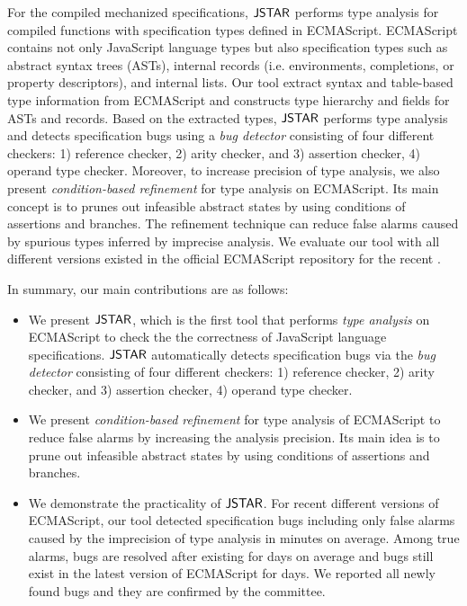 For the compiled mechanized specifications, $\textsf{JSTAR}$ performs type analysis for
compiled functions with specification types defined in ECMAScript.  ECMAScript
contains not only JavaScript language types but also specification types such as
abstract syntax trees (ASTs), internal records (i.e. environments, completions,
or property descriptors), and internal lists.  Our tool extract syntax and
table-based type information from ECMAScript and constructs type hierarchy and
fields for ASTs and records.  Based on the extracted types, $\textsf{JSTAR}$ performs
type analysis and detects specification bugs using a \textit{bug detector}
consisting of four different checkers: 1) reference checker, 2) arity checker,
and 3) assertion checker, 4) operand type checker.  Moreover, to increase
precision of type analysis, we also present \textit{condition-based refinement}
for type analysis on ECMAScript. Its main concept is to prunes out infeasible
abstract states by using conditions of assertions and branches.  The refinement
technique can reduce false alarms caused by spurious types inferred by imprecise
analysis.  We evaluate our tool with all  different versions existed
in the official ECMAScript repository for the recent .

In summary, our main contributions are as follows:
\begin{itemize}
  \item We present $\textsf{JSTAR}$, which is the first tool that performs \textit{type
    analysis} on ECMAScript to check the the correctness of JavaScript language
    specifications.  $\textsf{JSTAR}$ automatically detects specification bugs via the
    \textit{bug detector} consisting of four different checkers: 1) reference
    checker, 2) arity checker, and 3) assertion checker, 4) operand type
    checker.
  \item We present \textit{condition-based refinement} for type analysis of
    ECMAScript to reduce false alarms by increasing the analysis precision.  Its
    main idea is to prune out infeasible abstract states by using conditions of
    assertions and branches.
  \item We demonstrate the practicality of $\textsf{JSTAR}$. For recent 
    different versions of ECMAScript, our tool detected 
    specification bugs including only  false alarms caused by the
    imprecision of type analysis in  minutes on average.  Among
     true alarms,  bugs are resolved after existing for
     days on average and  bugs still exist in the latest
    version of ECMAScript for  days.  We reported all 
    newly found bugs and they are confirmed by the committee.
\end{itemize}

